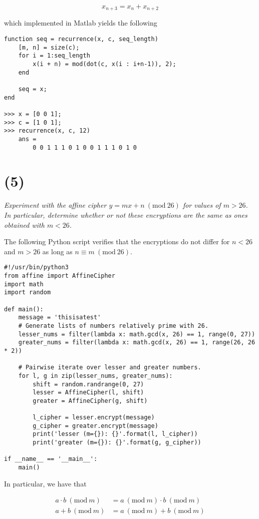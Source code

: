 \documentclass[12pt]{article}
\renewcommand{\mod}[1]{\mathrm{mod}\ #1}
\renewcommand{\pmod}[1]{\ (\mod{#1})}
\begin{document}
$$x_{n + 3} = x_n + x_{n + 2}$$

which implemented in Matlab yields the following

\begin{verbatim}
function seq = recurrence(x, c, seq_length)
    [m, n] = size(c);
    for i = 1:seq_length
        x(i + n) = mod(dot(c, x(i : i+n-1)), 2);
    end

    seq = x;
end

>>> x = [0 0 1];
>>> c = [1 0 1];
>>> recurrence(x, c, 12)
    ans =
        0 0 1 1 1 0 1 0 0 1 1 1 0 1 0
\end{verbatim}

\section*{(5)} \textit{Experiment with the affine cipher $y = m x + n \pmod{26}$ for values of $m > 26$. In particular, determine whether or not these encryptions are the same as ones obtained with $m < 26$.}

The following Python script verifies that the encryptions do not differ for $n < 26$ and $m > 26$ as long as $n \equiv m \pmod{26}$.

\begin{verbatim}
#!/usr/bin/python3
from affine import AffineCipher
import math
import random

def main():
    message = 'thisisatest'
    # Generate lists of numbers relatively prime with 26.
    lesser_nums = filter(lambda x: math.gcd(x, 26) == 1, range(0, 27))
    greater_nums = filter(lambda x: math.gcd(x, 26) == 1, range(26, 26 * 2))

    # Pairwise iterate over lesser and greater numbers.
    for l, g in zip(lesser_nums, greater_nums):
        shift = random.randrange(0, 27)
        lesser = AffineCipher(l, shift)
        greater = AffineCipher(g, shift)

        l_cipher = lesser.encrypt(message)
        g_cipher = greater.encrypt(message)
        print('lesser (m={}): {}'.format(l, l_cipher))
        print('greater (m={}): {}'.format(g, g_cipher))

if __name__ == '__main__':
    main()
\end{verbatim}

In particular, we have that

\begin{align*}
    a \cdot b \pmod{m} &= a \pmod{m} \cdot b \pmod{m}\\
    a + b \pmod{m} &= a \pmod{m} + b \pmod{m}\\
\end{align*}
\end{document}
